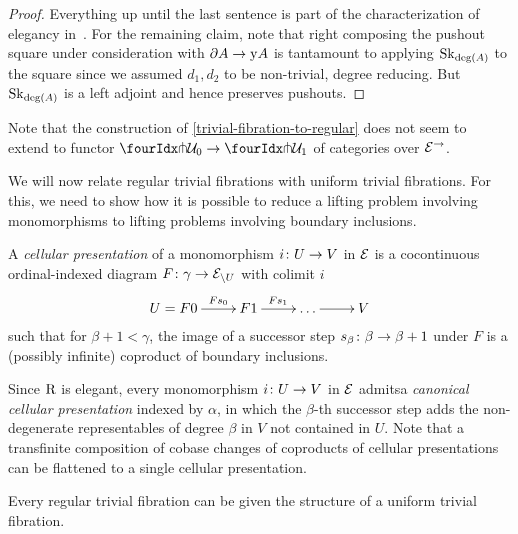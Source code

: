 \documentclass[reqno,10pt,a4paper,oneside,draft]{amsart}
\begin{document}
\begin{proof}
Everything up until the last sentence is part of the characterization of elegancy in~\cite[Proposition~3.8]{bergner-rezk-elegant}.
For the remaining claim, note that right composing the pushout square under consideration with $\partial A \to \mathrm{y} A$ is tantamount to applying $\mathrm{Sk}_{\deg(A)}$ to the square since we assumed $d_1, d_2$ to be non-trivial, \ie degree reducing.
But $\mathrm{Sk}_{\deg(A)}$ is a left adjoint and hence preserves pushouts.
\end{proof}


Note that the construction of \cref{trivial-fibration-to-regular} does not seem to extend to functor $\liftr{\cal{U}_0} \to \liftr{\cal{U}_1}$ of categories over $\mathcal{E}^{\to}$.

\medskip

We will now relate regular trivial fibrations with uniform trivial fibrations.
For this, we need to show how it is possible to reduce a lifting problem involving monomorphisms to lifting problems involving boundary inclusions.

\begin{definition} A \emph{cellular presentation} of a monomorphism $i \colon U \to V$ in $\mathcal{E}$ is a cocontinuous ordinal-indexed diagram $F \colon \gamma \to \mathcal{E}_{\backslash U}$ with colimit $i$
\[
\xymatrix{
  U = F 0
  \ar[r]^-{F s_0}
&
  F 1
  \ar[r]^{F s_1}
&
  \ldots
  \ar[r]
&
  V
}
\]
such that for $\beta + 1 < \gamma$, the image of a successor step $s_{\beta} \colon \beta \to \beta + 1$ under $F$ is a (possibly infinite) coproduct of boundary inclusions.
\end{definition}

Since $\mathrm{R}$ is elegant, every monomorphism $i \colon U \to V$ in $\mathcal{E}$ admitsa \emph{canonical cellular presentation} indexed by $\alpha$, in which the $\beta$-th successor step adds the non-degenerate representables of degree $\beta$ in $V$ not contained in $U$.
Note that a transfinite composition of cobase changes of coproducts of cellular presentations can be flattened to a single cellular presentation.

\begin{proposition} \label{regular-trivial-fibration-to-uniform}
Every regular trivial fibration can be given the structure of a uniform trivial fibration.
\end{proposition}
\end{document}

